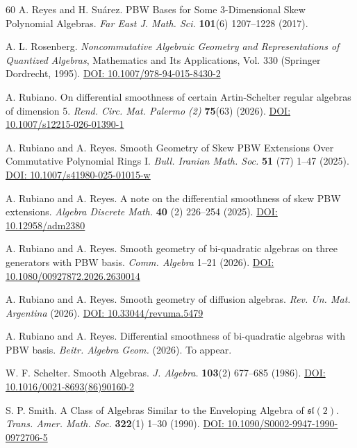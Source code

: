 \documentclass{amsart}
\theoremstyle{definition}
\theoremstyle{remark}
\numberwithin{equation}{section}
\begin{document}
\begin{thebibliography}{60}
 A. Reyes and H. Su\'arez. PBW Bases for Some 3-Dimensional Skew Polynomial Algebras. {\em Far East J. Math. Sci.} {\bf 101}(6) 1207--1228 (2017).

 A. L. Rosenberg. {\em Noncommutative Algebraic Geometry and Representations of Quantized Algebras}, Mathematics and Its Applications, Vol. 330 (Springer Dordrecht, 1995). \href{https://doi.org/10.1007/978-94-015-8430-2}{DOI: 10.1007/978-94-015-8430-2}

 A. Rubiano. On differential smoothness of certain Artin-Schelter regular algebras of dimension 5. {\em Rend. Circ. Mat. Palermo (2)} {\bf 75}(63) (2026). \href{https://doi.org/10.1007/s12215-026-01390-1}{DOI: 10.1007/s12215-026-01390-1}

 A. Rubiano and A. Reyes. Smooth Geometry of Skew PBW Extensions Over Commutative Polynomial Rings I. {\em Bull. Iranian Math. Soc.} {\bf 51} (77) 1--47 (2025). \href{https://doi.org/10.1007/s41980-025-01015-w}{DOI: 10.1007/s41980-025-01015-w}

 A. Rubiano and A. Reyes. A note on the differential smoothness of skew PBW extensions. {\em Algebra Discrete Math.} {\bf 40} (2) 226--254 (2025). \href{http://dx.doi.org/10.12958/adm2380}{DOI: 10.12958/adm2380}

 A. Rubiano and A. Reyes. Smooth geometry of bi-quadratic algebras on three generators with PBW basis. {\em Comm. Algebra} 1--21 (2026). \href{https://doi.org/10.1080/00927872.2026.2630014}{DOI: 10.1080/00927872.2026.2630014}

 A. Rubiano and A. Reyes. Smooth geometry of diffusion algebras. {\em Rev. Un. Mat. Argentina} (2026). \href{ https://doi.org/10.33044/revuma.5479}{DOI: 10.33044/revuma.5479}

 A. Rubiano and A. Reyes. Differential smoothness of bi-quadratic algebras with PBW basis. {\em Beitr. Algebra Geom.} (2026). To appear.

 W. F. Schelter. Smooth Algebras. {\em J. Algebra.} {\bf 103}(2) 677--685 (1986). \href{https://doi.org/10.1016/0021-8693(86)90160-2}{DOI: 10.1016/0021-8693(86)90160-2}

 S. P. Smith. A Class of Algebras Similar to the Enveloping Algebra of $\mathfrak{sl}(2)$. {\em Trans. Amer. Math. Soc. } {\bf 322}(1) 1--30 (1990). \href{https://www.ams.org/journals/tran/1990-322-01/S0002-9947-1990-0972706-5/}{DOI: 10.1090/S0002-9947-1990-0972706-5}


\end{thebibliography}
\end{document}
